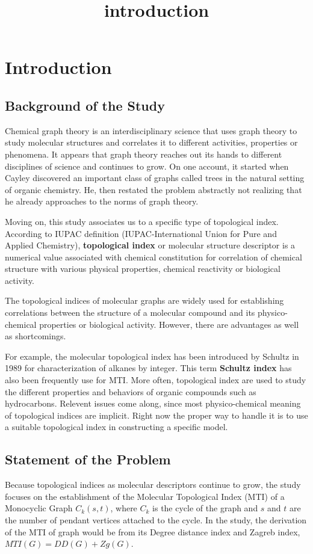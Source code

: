 \chapter{Introduction}
\label{chap:intro}
\title{introduction}

\section{Background of the Study}
\cite{topo_id_mod_schultz} Chemical graph theory is an interdisciplinary science that uses graph theory to study molecular structures and correlates it to different activities, properties or phenomena. It appears that graph theory reaches out its hands to different disciplines of science and continues to grow. On one account,\cite{hararygt} it started when Cayley discovered an important class of graphs called trees in the natural setting of organic chemistry. He, then restated the problem abstractly not realizing that he already approaches to the norms of graph theory. \medskip

Moving on, this study associates us to a specific type of topological index. \cite{dbti}  According to IUPAC definition (IUPAC-International Union for Pure and Applied Chemistry), \textbf{topological index} or molecular structure descriptor is a numerical value associated with chemical constitution for correlation of chemical structure with various physical properties, chemical reactivity or biological activity.  \medskip

The topological indices of molecular graphs are widely used for establishing correlations between the structure of a molecular compound and its physico-chemical properties or biological activity. However, there are advantages as well as shortcomings. \medskip

For example, \cite{rmti} the molecular topological index has been introduced by Schultz in 1989 for characterization of alkanes by integer. This term \textbf{Schultz index} has also been frequently use for MTI. More often, topological index are used to study the different properties and behaviors of organic compounds such as hydrocarbons. Relevent issues come along, since most physico-chemical meaning of topological indices are implicit. Right now the proper way to handle it is to use a suitable topological index in constructing a specific model. \medskip

\section{Statement of the Problem}
Because topological indices as molecular descriptors continue to grow, the study focuses on the establishment of the Molecular Topological Index (MTI) of a Monocyclic Graph $C_k(s,t)$, where $C_k$ is the cycle of the graph and $s$ and $t$ are the number of pendant vertices attached to the cycle. In the study, the derivation of the MTI of graph would be from its Degree distance index and Zagreb index, $MTI(G)=DD(G)+Zg(G)$.
 
